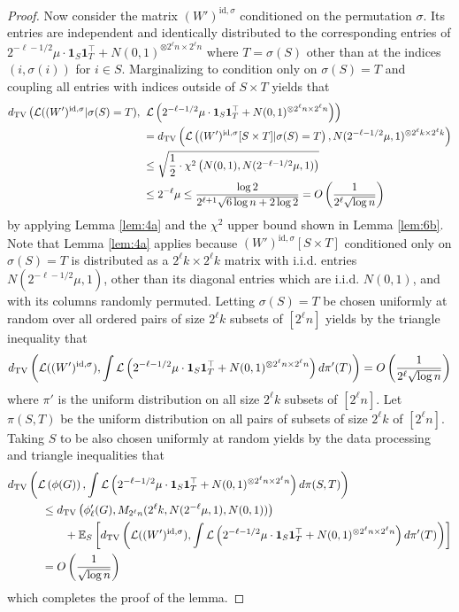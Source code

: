 \begin{proof}
Now consider the matrix $(W')^{\text{id}, \sigma}$ conditioned on the permutation $\sigma$. Its entries are independent and identically distributed to the corresponding entries of $2^{-\ell-1/2} \mu \cdot \mathbf{1}_S \mathbf{1}_T^\top + N(0, 1)^{\otimes 2^\ell n \times 2^\ell n}$ where $T = \sigma(S)$ other than at the indices $(i, \sigma(i))$ for $i \in S$. Marginalizing to condition only on $\sigma(S) = T$ and coupling all entries with indices outside of $S \times T$ yields that
\begin{align*}
d_{\text{TV}}\left( \mathcal{L}((W')^{\text{id}, \sigma} | \sigma(S) = T), \right. &\left. \mathcal{L}\left( 2^{-\ell-1/2} \mu \cdot \mathbf{1}_S \mathbf{1}_T^\top + N(0, 1)^{\otimes 2^\ell n \times 2^\ell n} \right) \right) \\
&= d_{\text{TV}}\left( \mathcal{L}\left( (W')^{\text{id}, \sigma}[S \times T] | \sigma(S) = T \right), N(2^{-\ell-1/2} \mu, 1)^{\otimes 2^\ell k \times 2^\ell k} \right) \\
&\le \sqrt{\frac{1}{2} \cdot \chi^2\left( N(0, 1), N(2^{-\ell-1/2}\mu, 1) \right)} \\
&\le 2^{-\ell} \mu \le  \frac{\log 2}{2^{\ell + 1} \sqrt{6 \log n + 2\log 2}} = O\left(\frac{1}{2^\ell\sqrt{\log n}} \right)
\end{align*}
by applying Lemma \ref{lem:4a} and the $\chi^2$ upper bound shown in Lemma \ref{lem:6b}. Note that Lemma \ref{lem:4a} applies because $(W')^{\text{id}, \sigma}[S \times T]$ conditioned only on $\sigma(S) = T$ is distributed as a $2^\ell k \times 2^\ell k$ matrix with i.i.d. entries $N(2^{-\ell-1/2} \mu, 1)$, other than its diagonal entries which are i.i.d. $N(0, 1)$, and with its columns randomly permuted. Letting $\sigma(S) = T$ be chosen uniformly at random over all ordered pairs of size $2^\ell k$ subsets of $[2^\ell n]$ yields by the triangle inequality that
$$d_{\text{TV}}\left( \mathcal{L}((W')^{\text{id}, \sigma}), \int \mathcal{L}\left( 2^{-\ell-1/2} \mu \cdot \mathbf{1}_S \mathbf{1}_T^\top + N(0, 1)^{\otimes 2^\ell n \times 2^\ell n} \right) d\pi'(T) \right) = O\left(\frac{1}{2^\ell\sqrt{\log n}} \right)$$
where $\pi'$ is the uniform distribution on all size $2^\ell k$ subsets of $[2^\ell n]$. Let $\pi(S, T)$ be the uniform distribution on all pairs of subsets of size $2^\ell k$ of $[2^\ell n]$. Taking $S$ to be also chosen uniformly at random yields by the data processing and triangle inequalities that
\begin{align*}
&d_{\text{TV}}\left( \mathcal{L}\left( \phi(G) \right), \int \mathcal{L}\left(2^{-\ell-1/2} \mu \cdot \mathbf{1}_S \mathbf{1}_T^\top + N(0, 1)^{\otimes 2^\ell n \times 2^\ell n} \right) d\pi(S, T) \right) \\
&\quad \quad \quad \le d_{\text{TV}}\left( \phi_\ell'(G), M_{2^{\ell} n}(2^{\ell} k, N(2^{-\ell}\mu, 1), N(0, 1)) \right) \\
&\quad \quad \quad \quad \quad + \mathbb{E}_S\left[d_{\text{TV}}\left( \mathcal{L}((W')^{\text{id}, \sigma}), \int \mathcal{L}\left( 2^{-\ell-1/2} \mu \cdot \mathbf{1}_S \mathbf{1}_T^\top + N(0, 1)^{\otimes 2^\ell n \times 2^\ell n} \right) d\pi'(T) \right) \right] \\
&\quad \quad \quad = O\left(\frac{1}{\sqrt{\log n}} \right)
\end{align*}
which completes the proof of the lemma.
\end{proof}

